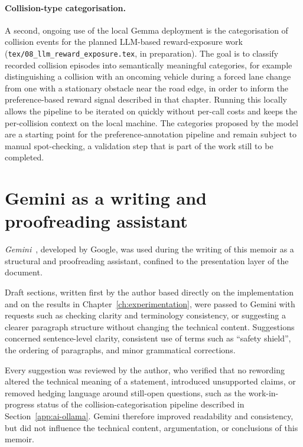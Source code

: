 \paragraph{Collision-type categorisation.}
A second, ongoing use of the local Gemma deployment is the categorisation of collision
events for the planned LLM-based reward-exposure work
(\texttt{tex/08\_llm\_reward\_exposure.tex}, in preparation). 
The goal is to classify recorded collision episodes
into semantically meaningful categories, for example distinguishing a collision with an
oncoming vehicle during a forced lane change from one with a stationary obstacle near the
road edge, in order to inform the preference-based reward signal described in that
chapter. Running this locally allows the pipeline to be iterated on quickly without
per-call costs and keeps the per-collision context on the local machine. The categories
proposed by the model are a starting point for the preference-annotation pipeline and
remain subject to manual spot-checking, a validation step that is part of the work still
to be completed.

\section{Gemini as a writing and proofreading assistant}\label{app:ai-gemini}

\textit{Gemini}~\cite{geminiteam2025gemini}, developed by Google, was used during the
writing of this memoir as a structural and proofreading assistant, confined to the
presentation layer of the document.

Draft sections, written first by the author based directly on the implementation and on
the results in Chapter~\ref{ch:experimentation}, were passed to Gemini with requests
such as checking clarity and terminology consistency, or suggesting a clearer paragraph
structure without changing the technical content. Suggestions concerned sentence-level
clarity, consistent use of terms such as ``safety shield'', the ordering of paragraphs,
and minor grammatical corrections.

Every suggestion was reviewed by the author, who verified that no rewording altered the
technical meaning of a statement, introduced unsupported claims, or removed hedging
language around still-open questions, such as the work-in-progress status of the
collision-categorisation pipeline described in Section~\ref{app:ai-ollama}. Gemini
therefore improved readability and consistency, but did not influence the technical
content, argumentation, or conclusions of this memoir.


